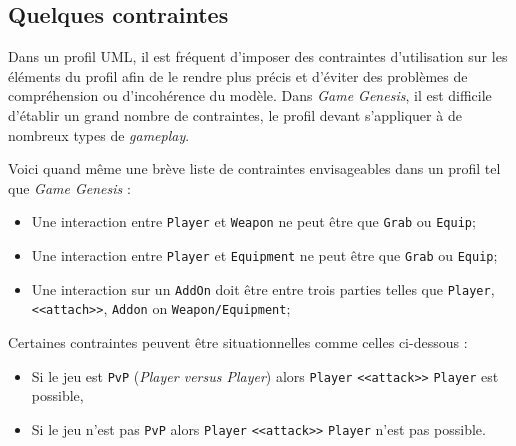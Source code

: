 

\subsection{Quelques contraintes}

Dans un profil UML, il est fréquent d'imposer des contraintes d'utilisation sur les \'el\'ements du profil afin de le rendre plus précis et d'éviter des problèmes de compréhension ou d'incohérence du modèle.
Dans \emph{Game Genesis}, il est difficile d'établir un grand nombre de contraintes, le profil devant s'appliquer à de nombreux types de \emph{gameplay}.

Voici quand m\^eme une br\`eve liste de contraintes envisageables dans un profil tel que \emph{Game Genesis} :
\begin{itemize}
    \item Une interaction entre \texttt{Player} et \texttt{Weapon} ne peut être que \texttt{Grab} ou \texttt{Equip};
    \item Une interaction entre \texttt{Player} et \texttt{Equipment} ne peut être que \texttt{Grab} ou \texttt{Equip};
    \item Une interaction sur un \texttt{AddOn} doit être entre trois parties telles que \texttt{Player}, \texttt{<<attach>>}, \texttt{Addon} on \texttt{Weapon/Equipment};
\end{itemize}


Certaines contraintes peuvent être situationnelles comme celles ci-dessous :
\begin{itemize}
    \item Si le jeu est \texttt{PvP} (\emph{Player versus Player}) alors \texttt{Player} \texttt{<<attack>>} \texttt{Player} est possible,
    \item Si le jeu n'est pas \texttt{PvP} alors \texttt{Player} \texttt{<<attack>>} \texttt{Player} n'est pas possible.
\end{itemize}


